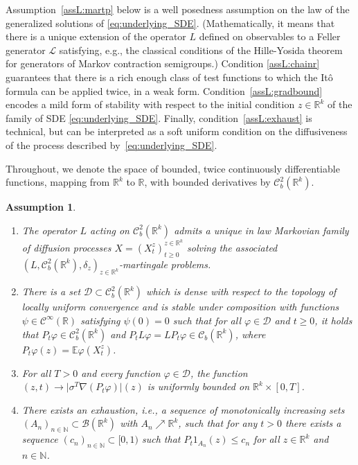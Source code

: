 \documentclass{article}
\newcommand{\R}{\mathbb{R}}
\newcommand{\E}{\mathbb{E}}
\newcommand{\N}{\mathbb{N}}
\newcommand{\C}{\mathcal C}
\newtheorem{assumption}[theorem]{Assumption}
\begin{document}
Assumption~\ref{assL:martp} below is a well posedness assumption on the law of the generalized solutions of
\eqref{eq:underlying_SDE}. (Mathematically, it means that there is a unique extension of the operator $L$
defined on observables to a Feller generator $\mathcal L$ satisfying, e.g., the classical conditions of the
Hille-Yosida theorem for generators of Markov contraction semigroups.) Condition \ref{assL:chainr} guarantees
that there is a rich enough class of test functions to which the It\^o formula can be applied twice, in a weak
form. Condition~\ref{assL:gradbound} encodes a mild form of stability with respect to the initial condition
$z \in \R^k$ of the family of SDE \eqref{eq:underlying_SDE}. Finally, condition~\ref{assL:exhaust} is
technical, but can be interpreted as a soft uniform condition on the diffusiveness of the process described
by~\eqref{eq:underlying_SDE}.

Throughout, we denote the space of bounded, twice continuously differentiable functions, mapping from $\R^k$
to $\R$, with bounded derivatives by $\C^2_b(\R^k)$.
\begin{assumption}
  \label{assumptionsonL}
  \begin{enumerate}[label=(L.{\arabic*})]
  \item \label{assL:martp}
    The operator $L$ acting on $\C_b^2(\R^k)$ admits a unique in law Markovian family of diffusion processes
    $X=(X_t^z)_{t \geq 0}^{z\in \R^k}$ solving the associated
    $(L,\C_b^2(\R^k), \delta_z)_{z \in \R^k}$-martingale problems.
       
  \item \label{assL:chainr} There is a set $\mathcal D\subset \C^2_b(\R^k) $ which is dense with respect to
    the topology of locally uniform convergence and is stable under composition with functions
    $\psi \in \C^\infty(\R)$ satisfying $\psi(0) = 0$ such that for all $\varphi \in \mathcal D$ and
    $t \geq 0$, it holds that $P_t \varphi \in \C^2_b(\R^k)$ and $P_t L\varphi = LP_t \varphi \in \C_b(\R^k)$,
    where $P_t \varphi(z) = \E \varphi(X_t^z)$.
  \item \label{assL:gradbound} For all $T>0$ and every function $\varphi \in \mathcal D$, the function
    $(z,t) \to \bigl|\sigma^T\nabla (P_t \varphi)\bigr|(z)$ is uniformly bounded on $\R^k\times [0,T]$.
  \item \label{assL:exhaust} There exists an exhaustion, i.e., a sequence of monotonically increasing sets $(A_n)_{n \in \N} \subset \mathcal{B}(\R^k)$ with
    $A_n \nearrow \R^k$, such that for any $t >0$ there exists a sequence $(c_n)_{n \in \N} \subset [0, 1)$
    such that $P_t 1_{A_n}(z) \leq c_n$ for all $z \in \R^k$ and $n \in \N$.
  \end{enumerate}
\end{assumption}
\end{document}
